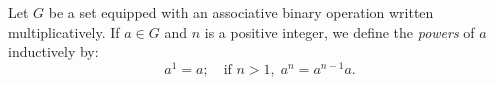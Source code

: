 Let $G$ be a set equipped with an associative binary operation written multiplicatively. If $a \in G$ and $n$ is a positive integer, we define the \textit{powers} of $a$ inductively by:
$$a^1 = a; \quad \text{if } n > 1,\; a^n = a^{n-1}a.$$
